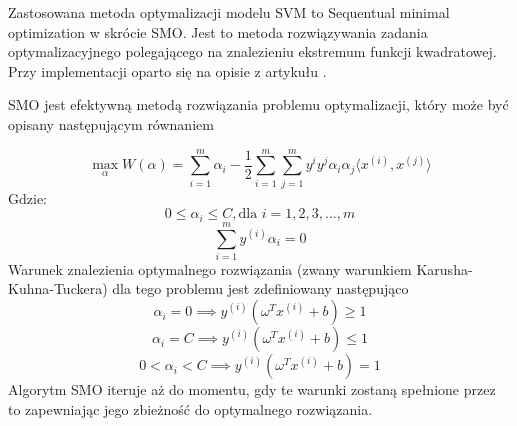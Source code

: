 \documentclass[[10pt,a4paper]{article}
\begin{document}
Zastosowana metoda optymalizacji modelu SVM to Sequentual minimal optimization w skrócie SMO. Jest to metoda rozwiązywania zadania optymalizacyjnego polegającego na znalezieniu ekstremum funkcji kwadratowej. Przy implementacji oparto się na opisie z artykułu \cite{svmsmo}. 

SMO jest efektywną metodą rozwiązania problemu optymalizacji, który może być opisany następującym równaniem

\begin{equation}
\max_{\alpha} W(\alpha) = \sum_{i=1}^{m}\alpha_i - \frac{1}{2}\sum_{i=1}^{m}\sum_{j=1}^{m}y^{i}y^{j}\alpha_i\alpha_j\langle x^{(i)},x^{(j)}\rangle
\end{equation}
Gdzie:
\begin{equation}
0\leq \alpha_i \leq C, \text{dla } i = 1, 2, 3, ..., m
\end{equation}
\begin{equation}
	\sum_{i=1}^{m}y^{(i)}\alpha_i=0
\end{equation}
Warunek znalezienia optymalnego rozwiązania (zwany warunkiem Karusha-Kuhna-Tuckera) dla tego problemu jest zdefiniowany następująco
\begin{equation}
\alpha_i = 0 \implies y^{(i)}(\omega^{T}x^{(i)}+b)\geq1
\end{equation}
\begin{equation}
\alpha_i = C \implies y^{(i)}(\omega^{T}x^{(i)}+b)\leq1
\end{equation}
\begin{equation}
0 < \alpha_i < C \implies y^{(i)}(\omega^{T}x^{(i)}+b)= 1
\end{equation}
Algorytm SMO iteruje aż do momentu, gdy te warunki zostaną spełnione przez to zapewniając jego zbieżność do optymalnego rozwiązania.
\end{document}
